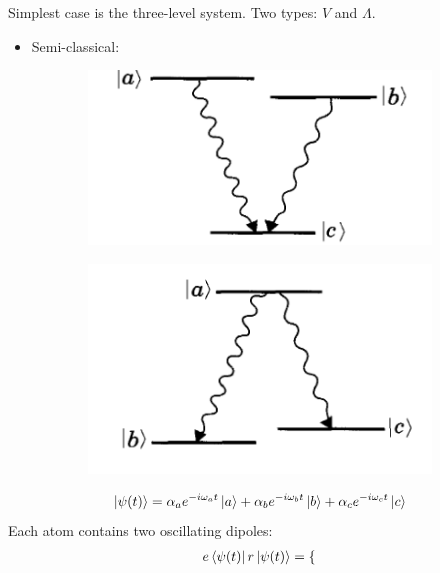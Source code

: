 \documentclass{beamer}
\theoremstyle{definition}
\newcommand{\al}{\alpha}
\begin{document}
\begin{frame}
	Simplest case is the three-level system. Two types: $V$ and $\Lambda$.
	\begin{itemize}
		\item Semi-classical:
	\end{itemize}

\begin{figure}[!htb]
	\begin{subfigure}{0.4\textwidth}
		\includegraphics[width=\textwidth]{V.png}
	\end{subfigure}
	\begin{subfigure}{0.4\textwidth}
		\includegraphics[width=\textwidth]{A.png}
	\end{subfigure}
\end{figure}
\begin{align*}
\ket{\psi(t)} = \al_a e^{-i \omega_a t}\ket{a} + \al_b e^{-i \omega_b t}\ket{b} + \al_c e^{-i \omega_c t}\ket{c}
\end{align*}
Each atom contains two oscillating dipoles:
\begin{align*}
e\bra{\psi(t)} r \ket{\psi(t)} = 
\begin{cases*}

\end{cases*}
\end{align*}
\end{frame}
\end{document}
